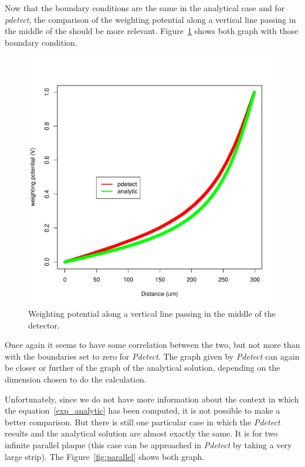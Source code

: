 \documentclass[11pt]{article}
\begin{document}
			Now that the boundary conditions are the same in the analytical case and for \textit{pdetect},
			the comparison of the weighting potential along a vertical line passing in the middle of the
			should be more relevant. Figure~\ref{fig:semi_free_conditions} shows both graph with those boundary
			condition.

			\begin{figure}[H]
				\center
				\includegraphics[scale=0.45]{images/boundary_conditions/semi-free.pdf}
				\caption{Weighting potential along a vertical line passing in the middle of the detector.}
				\label{fig:semi_free_conditions}
			\end{figure}

			Once again it seems to have some correlation between the two, but not more than with the boundaries
			set to zero for \textit{Pdetect}. The graph given by \textit{Pdetect} can again be closer or further
			of the graph of the analytical solution, depending on the dimension chosen to do the calculation.

			Unfortunately, since we do not have more information about the context in which the equation~\ref{exp_analytic}
			has been computed, it is not possible to make a better comparison. But there is still one particular
			case in which the \textit{Pdetect} results and the analytical solution are almost exactly the same.
			It is for two infinite parallel plaque (this case can be approached in \textit{Pdetect} by taking
			a very large strip). The Figure~\ref{fig:parallel} shows both graph.
\end{document}

